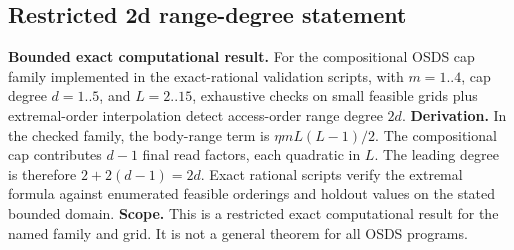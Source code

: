 \subsection{Restricted 2d range-degree statement}
\textbf{Bounded exact computational result.} For the compositional OSDS cap family implemented in the exact-rational validation scripts, with $m=1..4$, cap degree $d=1..5$, and $L=2..15$, exhaustive checks on small feasible grids plus extremal-order interpolation detect access-order range degree $2d$. \textbf{Derivation.} In the checked family, the body-range term is $\eta m L(L-1)/2$. The compositional cap contributes $d-1$ final read factors, each quadratic in $L$. The leading degree is therefore $2+2(d-1)=2d$. Exact rational scripts verify the extremal formula against enumerated feasible orderings and holdout values on the stated bounded domain. \textbf{Scope.} This is a restricted exact computational result for the named family and grid. It is not a general theorem for all OSDS programs.
